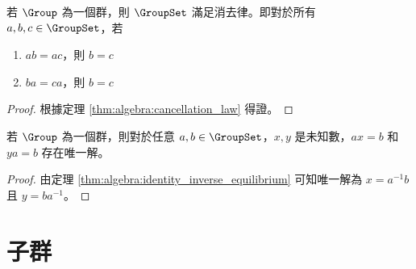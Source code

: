 \documentclass[12pt,a4paper,oneside]{report}
\begin{document}
\begin{CJK}{UTF8}{bkai}
\begin{mypropo}[群的消去律]
\label{pro:group:cancellation_law}
若 $\Group$ 為一個群，則 $\GroupSet$ 滿足消去律。即對於所有 $a,b,c\in{\GroupSet}$，若
\begin{enumerate}
\item $ab=ac$，則 $b=c$
\item $ba=ca$，則 $b=c$
\end{enumerate}
\end{mypropo}
\begin{proof}
根據定理 \ref{thm:algebra:cancellation_law} 得證。
\end{proof}

\begin{mythm}
\label{thm:group:equilibrium}
若 $\Group$ 為一個群，則對於任意 $a,b\in{\GroupSet}$，$x,y$ 是未知數，$ax=b$ 和 $ya=b$ 存在唯一解。
\end{mythm}
\begin{proof}
由定理 \ref{thm:algebra:identity_inverse_equilibrium} 可知唯一解為 $x=a^{-1}b$ 且 $y=ba^{-1}$。
\end{proof}

\section{子群}

\ifx \allfiles \undefined
\printindex[noun]

\clearpage
\end{CJK}
\end{document}
